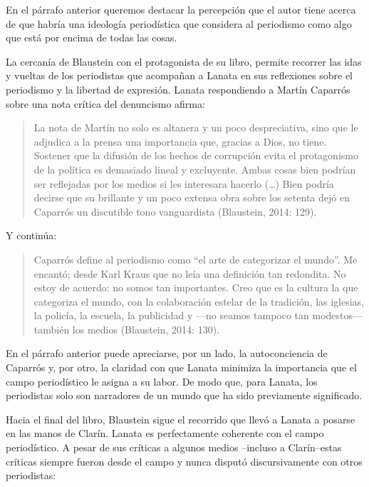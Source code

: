 En el párrafo anterior queremos destacar la percepción que el autor tiene acerca de que habría una ideología periodística que considera al periodismo como algo que está por encima de todas las cosas.

La cercanía de Blaustein con el protagonista de su libro, permite recorrer las idas y vueltas de los periodistas que acompañan a Lanata en sus reflexiones sobre el periodismo y la libertad de expresión. Lanata respondiendo a Martín Caparrós sobre una nota crítica del denuncismo afirma:

\begin{quote}
La nota de Martín no solo es altanera y un poco despreciativa, sino que le adjudica a la prensa una importancia que, gracias a Dios, no tiene. Sostener que la difusión de los hechos de corrupción evita el protagonismo de la política es demasiado lineal y excluyente. Ambas cosas bien podrían ser reflejadas por los medios si les interesara hacerlo (\ldots) Bien podría decirse que su brillante y un poco extensa obra sobre los setenta dejó en Caparrós un discutible tono vanguardista (Blaustein, 2014: 129).
\end{quote}

Y continúa:

\begin{quote}
Caparrós define al periodismo como ``el arte de categorizar el mundo''. Me encantó; desde Karl Kraus que no leía una definición tan redondita. No estoy de acuerdo: no somos tan importantes. Creo que es la cultura la que categoriza el mundo, con la colaboración estelar de la tradición, las iglesias, la policía, la escuela, la publicidad y ---no seamos tampoco tan modestos--- también los medios (Blaustein, 2014: 130).
\end{quote}

En el párrafo anterior puede apreciarse, por un lado, la autoconciencia de Caparrós y, por otro, la claridad con que Lanata minimiza la importancia que el campo periodístico le asigna a su labor. De modo que, para Lanata, los periodistas solo son narradores de un mundo que ha sido previamente significado.

Hacia el final del libro, Blaustein sigue el recorrido que llevó a Lanata a posarse en las manos de Clarín. Lanata es perfectamente coherente con el campo periodístico. A pesar de sus críticas a algunos medios --incluso a Clarín--estas críticas siempre fueron desde el campo y nunca disputó discursivamente con otros periodistas:

